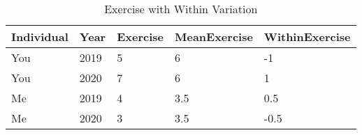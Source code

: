 \begin{table}[!htbp] \centering \renewcommand*{\arraystretch}{1.1}\caption{Exercise with Within Variation}\label{tab:fixedeffects-within2}
\begin{tabular}{lllll}
\hline
\hline
Individual & Year & Exercise & MeanExercise & WithinExercise \\ 
\hline
You & 2019 & 5 & 6 & -1 \\ 
You & 2020 & 7 & 6 & 1 \\ 
Me & 2019 & 4 & 3.5 & 0.5 \\ 
Me & 2020 & 3 & 3.5 & -0.5\\ 
\hline
\hline
\end{tabular}
\end{table}

